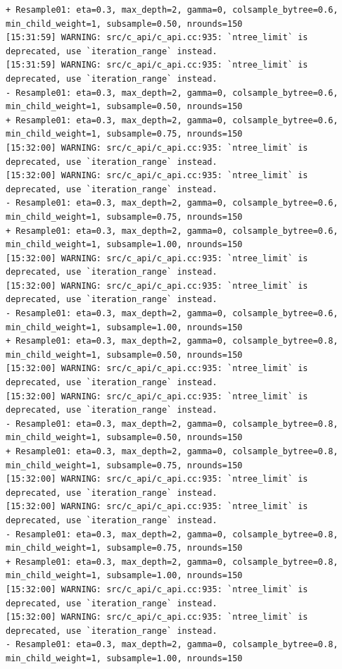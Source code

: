 \documentclass[
  letterpaper,
  DIV=11,
  numbers=noendperiod]{scrartcl}
\begin{document}
\begin{verbatim}
+ Resample01: eta=0.3, max_depth=2, gamma=0, colsample_bytree=0.6, min_child_weight=1, subsample=0.50, nrounds=150 
[15:31:59] WARNING: src/c_api/c_api.cc:935: `ntree_limit` is deprecated, use `iteration_range` instead.
[15:31:59] WARNING: src/c_api/c_api.cc:935: `ntree_limit` is deprecated, use `iteration_range` instead.
- Resample01: eta=0.3, max_depth=2, gamma=0, colsample_bytree=0.6, min_child_weight=1, subsample=0.50, nrounds=150 
+ Resample01: eta=0.3, max_depth=2, gamma=0, colsample_bytree=0.6, min_child_weight=1, subsample=0.75, nrounds=150 
[15:32:00] WARNING: src/c_api/c_api.cc:935: `ntree_limit` is deprecated, use `iteration_range` instead.
[15:32:00] WARNING: src/c_api/c_api.cc:935: `ntree_limit` is deprecated, use `iteration_range` instead.
- Resample01: eta=0.3, max_depth=2, gamma=0, colsample_bytree=0.6, min_child_weight=1, subsample=0.75, nrounds=150 
+ Resample01: eta=0.3, max_depth=2, gamma=0, colsample_bytree=0.6, min_child_weight=1, subsample=1.00, nrounds=150 
[15:32:00] WARNING: src/c_api/c_api.cc:935: `ntree_limit` is deprecated, use `iteration_range` instead.
[15:32:00] WARNING: src/c_api/c_api.cc:935: `ntree_limit` is deprecated, use `iteration_range` instead.
- Resample01: eta=0.3, max_depth=2, gamma=0, colsample_bytree=0.6, min_child_weight=1, subsample=1.00, nrounds=150 
+ Resample01: eta=0.3, max_depth=2, gamma=0, colsample_bytree=0.8, min_child_weight=1, subsample=0.50, nrounds=150 
[15:32:00] WARNING: src/c_api/c_api.cc:935: `ntree_limit` is deprecated, use `iteration_range` instead.
[15:32:00] WARNING: src/c_api/c_api.cc:935: `ntree_limit` is deprecated, use `iteration_range` instead.
- Resample01: eta=0.3, max_depth=2, gamma=0, colsample_bytree=0.8, min_child_weight=1, subsample=0.50, nrounds=150 
+ Resample01: eta=0.3, max_depth=2, gamma=0, colsample_bytree=0.8, min_child_weight=1, subsample=0.75, nrounds=150 
[15:32:00] WARNING: src/c_api/c_api.cc:935: `ntree_limit` is deprecated, use `iteration_range` instead.
[15:32:00] WARNING: src/c_api/c_api.cc:935: `ntree_limit` is deprecated, use `iteration_range` instead.
- Resample01: eta=0.3, max_depth=2, gamma=0, colsample_bytree=0.8, min_child_weight=1, subsample=0.75, nrounds=150 
+ Resample01: eta=0.3, max_depth=2, gamma=0, colsample_bytree=0.8, min_child_weight=1, subsample=1.00, nrounds=150 
[15:32:00] WARNING: src/c_api/c_api.cc:935: `ntree_limit` is deprecated, use `iteration_range` instead.
[15:32:00] WARNING: src/c_api/c_api.cc:935: `ntree_limit` is deprecated, use `iteration_range` instead.
- Resample01: eta=0.3, max_depth=2, gamma=0, colsample_bytree=0.8, min_child_weight=1, subsample=1.00, nrounds=150 

\end{verbatim}
\end{document}
